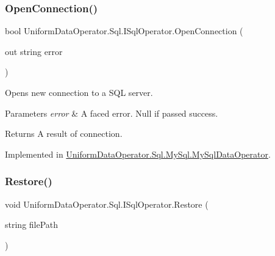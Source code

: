 \mbox{\label{interface_uniform_data_operator_1_1_sql_1_1_i_sql_operator_a6fc9e5efd1e21ae9998b9c56ae9e347c}} 
\subsubsection{\texorpdfstring{Open\+Connection()}{OpenConnection()}}
{\footnotesize\ttfamily bool Uniform\+Data\+Operator.\+Sql.\+I\+Sql\+Operator.\+Open\+Connection (\begin{DoxyParamCaption}\item[{out string}]{error }\end{DoxyParamCaption})}



Opens new connection to a S\+QL server. 


\begin{DoxyParams}{Parameters}
{\em error} & A faced error. Null if passed success.\\
\hline
\end{DoxyParams}
\begin{DoxyReturn}{Returns}
A result of connection.
\end{DoxyReturn}


Implemented in \mbox{\hyperlink{class_uniform_data_operator_1_1_sql_1_1_my_sql_1_1_my_sql_data_operator_ae7ad4f4d29d927fa8551b087a6e596b5}{Uniform\+Data\+Operator.\+Sql.\+My\+Sql.\+My\+Sql\+Data\+Operator}}.

\mbox{\label{interface_uniform_data_operator_1_1_sql_1_1_i_sql_operator_acf6fdbfc57a21efc371e0772244defd5}} 
\subsubsection{\texorpdfstring{Restore()}{Restore()}}
{\footnotesize\ttfamily void Uniform\+Data\+Operator.\+Sql.\+I\+Sql\+Operator.\+Restore (\begin{DoxyParamCaption}\item[{string}]{file\+Path }\end{DoxyParamCaption})}



